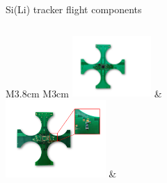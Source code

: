\documentclass[aspectratio=169,xcolor=dvipsnames,handout]{beamer} %
\begin{document}
\begin{frame}{Si(Li) tracker flight components}
    \fontsize{8.5pt}{1}\selectfont
    \begin{columns}
            \begin{tabular}{M{3.8cm} M{3cm}}
                \includegraphics[width=3cm]{images/flight_components_validation/FEB_immagine.pdf} &  \\\vspace{0.5cm}
                \includegraphics[width=3.8cm]{images/flight_components_validation/dummy_image.pdf} & 
            \end{tabular}
        

\end{columns}
\end{frame}
\end{document}
